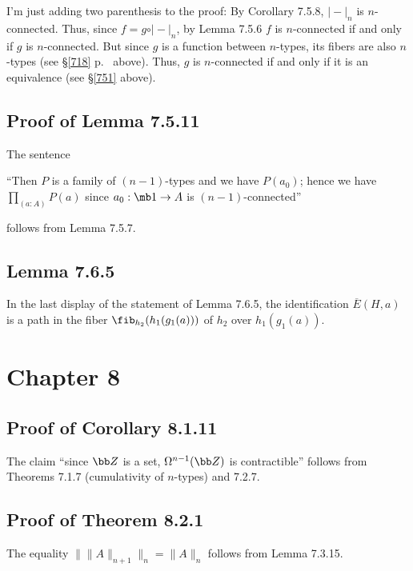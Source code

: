 \documentclass[12pt]{article}
\begin{document}
I'm just adding two parenthesis to the proof: By Corollary 7.5.8, $\vert-\vert_n$ is $n$-connected. Thus, since $f=g\circ\vert-\vert_n$, by Lemma 7.5.6 $f$ is $n$-connected if and only if $g$ is $n$-connected. But since $g$ is a function between $n$-types, its fibers are also $n$-types (see \S\ref{718} p.~\pageref{718} above). Thus, $g$ is $n$-connected if and only if it is an equivalence (see \S\ref{751} above).


\subsection{Proof of Lemma 7.5.11}

The sentence 

\nn``Then $P$ is a family of $(n-1)$-types and we have $P(a_0)$; hence we have $\prod_{(a:A)}P(a)$ since $a_0:\mb1\to A$ is $(n-1)$-connected''

\nn follows from Lemma 7.5.7.


\subsection{Lemma 7.6.5}

In the last display of the statement of Lemma 7.6.5, the identification $\overline{E}(H,a)$ is a path in the fiber $\fib_{h_2}(h_1(g_1(a)))$ of $h_2$ over $h_1(g_1(a))$.


\section{Chapter 8}

\subsection{Proof of Corollary 8.1.11}

The claim ``since $\bb Z$ is a set, $\Omega^{n-1}(\bb Z)$ is contractible'' follows from Theorems 7.1.7 (cumulativity of $n$-types) and 7.2.7.


\subsection{Proof of Theorem 8.2.1}

The equality $\lVert\lVert A\rVert_{n+1}\rVert_n=\lVert A\rVert_n$ follows from Lemma 7.3.15.
\end{document}
